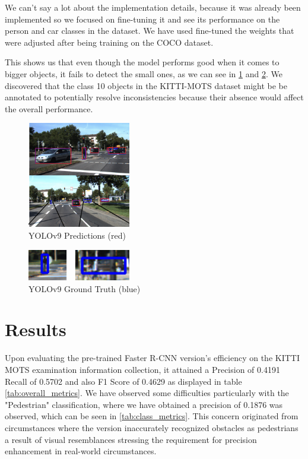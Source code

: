 \documentclass{IEEEtran}
\begin{document}
	We can’t say a lot about the implementation details, because it was already been implemented so we focused on fine-tuning it and see its performance on the person and car classes in the dataset. We have used fine-tuned the weights that were adjusted after being training on the COCO dataset. 
	
	This shows us that even though the model performs good when it comes to bigger objects, it fails to detect the small ones, as we can see in \ref{fig:yolo_predictions} and \ref{fig:yolo_gt}. We discovered that the class 10 objects in the KITTI-MOTS dataset might be be annotated to potentially resolve inconsistencies because their absence would affect the overall performance.
	
	\begin{figure}[htbp]
		\centering
		\includegraphics[width=0.4\textwidth]{images/yolo_1.png} 
		\caption{YOLOv9 Predictions (red)}
		\label{fig:yolo_predictions}
	\end{figure}
	
	\begin{figure}[htbp]
		\centering
		\includegraphics[width=0.4\textwidth]{images/yolo_2.png} 
		\caption{YOLOv9 Ground Truth (blue)}
		\label{fig:yolo_gt}
	\end{figure}
	
	\section{Results}
	
	Upon evaluating the pre-trained Faster R-CNN version's efficiency on the KITTI MOTS examination information collection, it attained a Precision of 0.4191 Recall of 0.5702 and also F1 Score of 0.4629 as displayed in table \ref{tab:overall_metrics}. We have observed some difficulties particularly with the "Pedestrian" classification, where we have obtained a precision of 0.1876 was observed, which can be seen in \ref{tab:class_metrics}. This concern originated from circumstances where the version inaccurately recognized obstacles as pedestrians  a result of visual resemblances stressing the requirement for precision enhancement in real-world circumstances.
	
\end{document}
